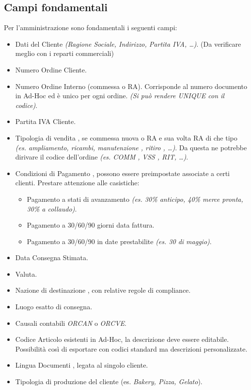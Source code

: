 \documentclass[12pt, a4paper]{article} %
\begin{document}
\subsection{Campi fondamentali}
Per l'amministrazione sono fondamentali i seguenti campi:
\begin{itemize}
      \item Dati del Cliente \textit{(Ragione Sociale, Indirizzo, Partita IVA, \dots)}. (Da
            verificare meglio con i reparti commerciali)
      \item Numero Ordine Cliente.
      \item Numero Ordine Interno (commessa o RA). Corrisponde al numero documento in
            Ad-Hoc ed è unico per ogni ordine. \textit{(Si può rendere UNIQUE con il
                  codice)}.
      \item Partita IVA Cliente.
      \item Tipologia di vendita , se commessa nuova o RA e sua volta RA di che tipo
            \textit{(es. ampliamento, ricambi, manutenzione , ritiro , \dots)}. Da questa
            ne potrebbe dirivare il codice dell'ordine \textit{(es. COMM , VSS , RIT,
                  \dots)}.
      \item Condizioni di Pagamento , possono essere preimpostate associate a certi
            clienti. Prestare attenzione alle casistiche:
            \begin{itemize}
                  \item Pagamento a stati di avanzamento \textit{(es. 30\% anticipo, 40\% merce pronta,
                              30\% a collaudo)}.
                  \item Pagamento a 30/60/90 giorni data fattura.
                  \item Pagamento a 30/60/90 in date prestabilite \textit{(es. 30 di maggio)}.
            \end{itemize}
      \item Data Consegna Stimata.
      \item Valuta.
      \item Nazione di destinazione , con relative regole di compliance.
      \item Luogo esatto di consegna.
      \item Causali contabili \textit{ORCAN} o \textit{ORCVE}.
      \item Codice Articolo esistenti in Ad-Hoc, la descrizione deve essere editabile.
            Possibilità così di esportare con codici standard ma descrizioni
            personalizzate.
      \item Lingua Documenti , legata al singolo cliente.
      \item Tipologia di produzione del cliente (es. \textit{Bakery, Pizza, Gelato}).
\end{itemize} 
\end{document}
